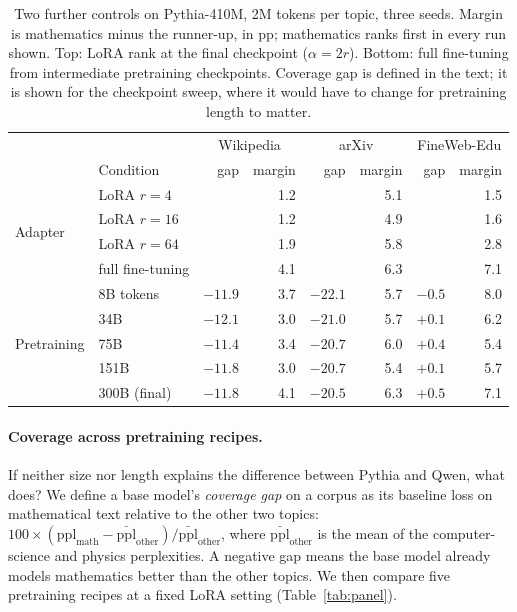 \documentclass[11pt]{article}
\begin{document}
\begin{table}[t]
\centering
\caption{Two further controls on Pythia-410M, 2M tokens per topic, three
seeds. Margin is mathematics minus the runner-up, in pp; mathematics ranks
first in every run shown. Top: LoRA rank at the final checkpoint
($\alpha{=}2r$). Bottom: full fine-tuning from intermediate pretraining
checkpoints. Coverage gap is defined in the text; it is shown for the
checkpoint sweep, where it would have to change for pretraining length to
matter.}
\label{tab:controls}
\small
\begin{tabular}{llrrrrrr}
\toprule
 & & \multicolumn{2}{c}{Wikipedia} & \multicolumn{2}{c}{arXiv} & \multicolumn{2}{c}{FineWeb-Edu} \\
 & Condition & gap & margin & gap & margin & gap & margin \\
\midrule
\multirow{4}{*}{Adapter} & LoRA $r{=}4$  & & 1.2 & & 5.1 & & 1.5 \\
 & LoRA $r{=}16$ & & 1.2 & & 4.9 & & 1.6 \\
 & LoRA $r{=}64$ & & 1.9 & & 5.8 & & 2.8 \\
 & full fine-tuning & & 4.1 & & 6.3 & & 7.1 \\
\midrule
\multirow{5}{*}{Pretraining} & 8B tokens   & $-11.9$ & 3.7 & $-22.1$ & 5.7 & $-0.5$ & 8.0 \\
 & 34B  & $-12.1$ & 3.0 & $-21.0$ & 5.7 & $+0.1$ & 6.2 \\
 & 75B  & $-11.4$ & 3.4 & $-20.7$ & 6.0 & $+0.4$ & 5.4 \\
 & 151B & $-11.8$ & 3.0 & $-20.7$ & 5.4 & $+0.1$ & 5.7 \\
 & 300B (final) & $-11.8$ & 4.1 & $-20.5$ & 6.3 & $+0.5$ & 7.1 \\
\bottomrule
\end{tabular}
\end{table}

\paragraph{Coverage across pretraining recipes.} If neither size nor length
explains the difference between Pythia and Qwen, what does? We define a base
model's \emph{coverage gap} on a corpus as its baseline loss on
mathematical text relative to the other two topics:
$100\times(\mathrm{ppl}_{\text{math}}-\bar{\mathrm{ppl}}_{\text{other}})/\bar{\mathrm{ppl}}_{\text{other}}$,
where $\bar{\mathrm{ppl}}_{\text{other}}$ is the mean of the computer-science
and physics perplexities. A negative gap means the base model already models
mathematics better than the other topics. We then compare five pretraining
recipes at a fixed LoRA setting (Table~\ref{tab:panel}).
\end{document}
